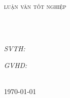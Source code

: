 \begin{titlepage}
\begin{center}
{\scshape\LARGE \univname\par}
\vspace{0.5cm}
{\scshape\LARGE \facname\par}
\vspace{1.0cm} %
\\
\vspace{1.0cm}
\textsc{\Large luận văn tốt nghiệp}\\[0.5cm] %

\HRule \\[0.4cm] %
{\huge \bfseries \ttitle\par}\vspace{0.4cm} %
\HRule \\[1.5cm] %
 
\begin{minipage}[t]{0.4\textwidth}
\begin{flushleft} \large
\emph{SVTH:}\\
\authorname 
\end{flushleft}
\end{minipage}
\begin{minipage}[t]{0.45\textwidth}
\begin{flushright} \large
\emph{GVHD:} \\
\supname
\end{flushright}
\end{minipage}\\[1cm]
 
{\large \today} %

\end{center}
\end{titlepage}